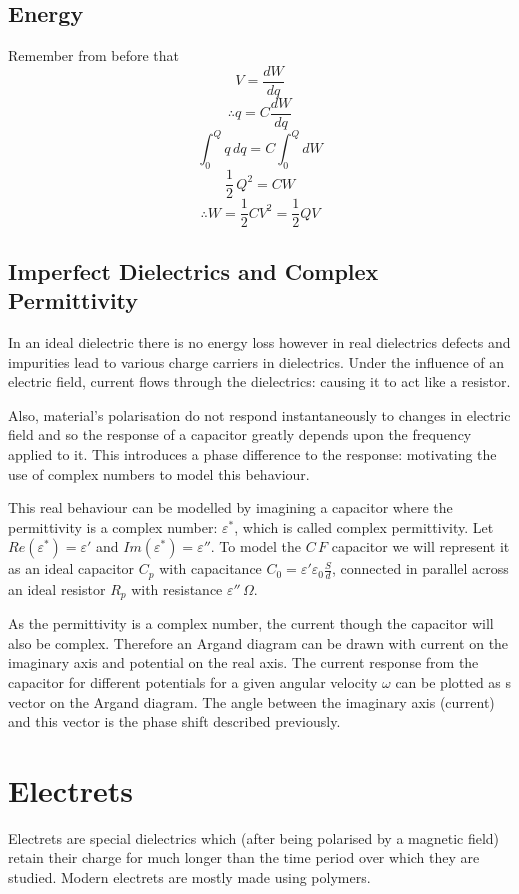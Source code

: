 \documentclass[11pt,a4paper]{report}
\begin{document}
\subsection{Energy}
Remember from before that 
\[V=\frac{dW}{dq}\]
\[\therefore q=C\frac{dW}{dq}\]
\[\int_0^Q q \, dq = C \int_0^Q dW\]
\[\frac{1}{2} \, Q^2 = CW\]
\[\therefore W=\frac{1}{2}CV^2=\frac{1}{2}QV\]

\subsection{Imperfect Dielectrics and Complex Permittivity}
In an ideal dielectric there is no energy loss however in real dielectrics defects and impurities lead to various charge carriers in dielectrics. Under the influence of an electric field, current flows through the dielectrics: causing it to act like a resistor. 

Also, material's polarisation do not respond instantaneously to changes in electric field and so the response of a capacitor greatly depends upon the frequency applied to it. This introduces a phase difference to the response: motivating the use of complex numbers to model this behaviour.

This real behaviour can be modelled by imagining a capacitor where the permittivity is a complex number: $\varepsilon^*$, which is called complex permittivity. Let $Re(\varepsilon^*)=\varepsilon'$ and $Im(\varepsilon^*)=\varepsilon''$. To model the $C \, F$ capacitor we will represent it as an ideal capacitor $C_p$ with capacitance $C_0 =\varepsilon'\varepsilon_0\frac{S}{d}$, connected in parallel across an ideal resistor $R_p$ with resistance $\varepsilon'' \, \Omega$.

As the permittivity is a complex number, the current though the capacitor will also be complex. Therefore an Argand diagram can be drawn with current on the imaginary axis and potential on the real axis. The current response from the capacitor for different potentials for a given angular velocity $\omega$ can be plotted as s vector on the Argand diagram. The angle between the imaginary axis (current) and this vector is the phase shift described previously.

\section{Electrets}
Electrets are special dielectrics which (after being polarised by a magnetic field) retain their charge for much longer than the time period over which they are studied. Modern electrets are mostly made using polymers. 
\end{document}
